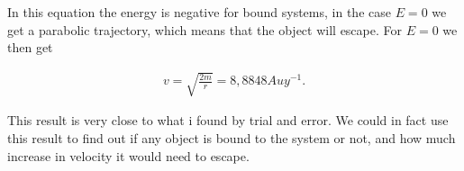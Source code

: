 \documentclass[norsk,a4paper,12pt]{article}
\begin{document}
In this equation the energy is negative for bound systems, in the case $E = 0$ we get a parabolic trajectory, which means that the 
object will escape. For $E = 0$ we then get

\begin{align}
v = \sqrt{\frac{2 m}{r}} = 8,8848 Auy^{-1}.
\end{align}

This result is very close to what i found by trial and error. We could in fact use this result to find out if any object is bound
to the system or not, and how much increase in velocity it would need to escape.

\begin{figure}[H]
  \begin{center}

\end{center}
\end{figure}
\end{document}
